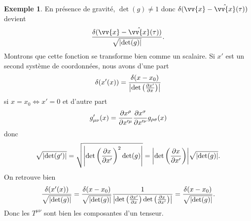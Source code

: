 \documentclass[a4paper,11pt]{report}
\theoremstyle{definition}
\theoremstyle{plain}
\theoremstyle{definition}
\newtheorem{exmp}{Exemple}[chapter]
\theoremstyle{remark}
\begin{document}
\begin{exmp}
                En présence de gravité, $\det(g)\neq 1$ donc $\delta(\vv{x}-\hat{\vv{x}}(\tau))$ devient
                \begin{equation} \frac{\delta(\vv{x}-\hat{\vv{x}}(\tau))}{\sqrt{\abs{\det(g)}}}.
                \end{equation}
                Montrons que cette fonction se transforme bien comme un scalaire. Si $x'$ est un second système de coordonnées, nous avons d'une part
                \begin{equation}
                    \delta(x'(x)) = \frac{\delta(x-x_0)}{\abs{\det\left( \pdv{x'}{x} \right)}}
                \end{equation}
                si $x = x_0\Leftrightarrow x' = 0$ et d'autre part
                \begin{equation}
                    g'_{\mu\nu}(x) = \pdv{x^\rho}{x'^\mu}\pdv{x^\sigma}{x'^\nu} g_{\rho\sigma}(x)
                \end{equation}
                donc
                \begin{equation}
                    \sqrt{\abs{\det(g')}} = \sqrt{\abs{\det\left( \pdv{x}{x'}\right)^2 \det(g)}} = \abs{\det\left(\pdv{x}{x'}\right)} \sqrt{\abs{\det(g)}}.
                \end{equation}
                On retrouve bien
                \begin{equation}
                    \frac{\delta(x'(x))}{\sqrt{\abs{\det(g)}}} = \frac{\delta(x-x_0)}{\sqrt{\abs{\det(g)}}}\frac{1}{\abs{\det\left( \pdv{x'}{x}\right)\det\left( \pdv{x}{x'}\right)}} = \frac{\delta(x-x_0)}{\sqrt{\abs{\det(g)}}}.
                \end{equation}
                Donc les $T^{\mu\nu}$ sont bien les composantes d'un tenseur.
            \end{exmp}
            
\end{document}
